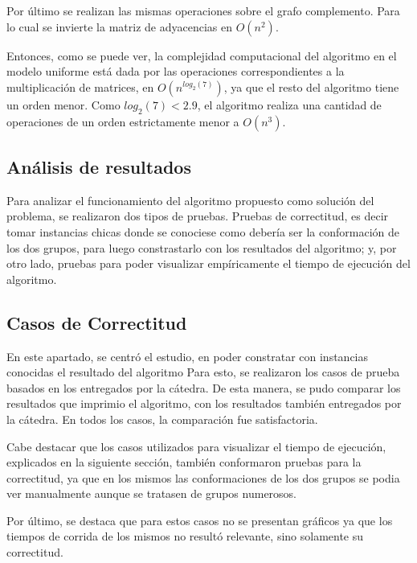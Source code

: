 \documentclass[a4paper, 12pt]{article}
\begin{document}
Por último se realizan las mismas operaciones sobre el grafo complemento. Para lo cual se invierte la matriz de adyacencias en $O \left( n^2 \right)$.


Entonces, como se puede ver, la complejidad computacional del algoritmo en el modelo uniforme está dada por las operaciones correspondientes a la multiplicación de matrices, en $O \left( n^{log_2\left(7\right)} \right) $, ya que el resto del algoritmo tiene un orden menor. Como $log_2\left(7\right) < 2.9 $, el algoritmo realiza una cantidad de operaciones de un orden estrictamente menor a $O\left( n^3\right) $.




\subsection*{Análisis de resultados}
Para analizar el funcionamiento del algoritmo propuesto como soluci\'on del problema, se realizaron dos tipos de pruebas. Pruebas de correctitud, es decir tomar instancias chicas donde se conociese como deber\'ia ser la conformaci\'on de los dos grupos, para luego constrastarlo con los resultados del algoritmo; y, por otro lado, pruebas para poder visualizar emp\'iricamente el tiempo de ejecuci\'on del algoritmo.

\subsection*{Casos de Correctitud}
En este apartado, se centr\'o el estudio, en poder constratar con instancias conocidas el resultado del algoritmo Para esto, se realizaron los casos de prueba basados en los entregados por la c\'atedra. De esta manera, se pudo comparar los resultados que imprimio el algoritmo, con los resultados tambi\'en entregados por la c\'atedra. En todos los casos, la comparaci\'on fue satisfactoria. 

Cabe destacar que los casos utilizados para visualizar el tiempo de ejecuci\'on, explicados en la siguiente secci\'on, tambi\'en conformaron pruebas para la correctitud, ya que en los mismos las conformaciones de los dos grupos se podia ver manualmente aunque se tratasen de grupos numerosos.

Por \'ultimo, se destaca que para estos casos no se presentan gr\'aficos ya que los tiempos de corrida de los mismos no result\'o relevante, sino solamente su correctitud.
\end{document}
